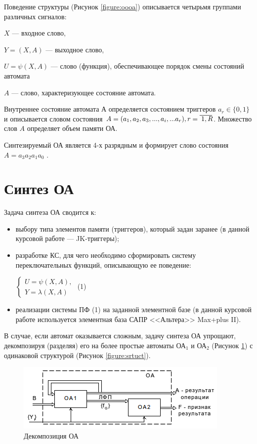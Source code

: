 Поведение структуры (Рисунок \ref{figure:oooa}) описывается четырьмя группами различных сигналов:

$X$ --- входное слово,

$Y = (X,A)$ --- выходное слово,

$U = \psi(X,A)$ --- слово (функция), обеспечивающее порядок смены состояний автомата

$A$ --- слово, характеризующее состояние автомата.

Внутреннее состояние автомата $А$ определяется состоянием триггеров $a_r \in \{0, 1\}$  и описывается словом состояния $A = (a_1, a_2, a_3, ..., a_i, ... a_r), r = \oline{1,R}$. Множество слов $A$ определяет объем памяти ОА.

Синтезируемый ОА является 4-х разрядным и формирует слово состояния $A = a_3a_2a_1a_0$ .


\newpage
\section{Синтез ОА}

Задача синтеза ОА сводится к:
\begin{itemize}
	\item выбору типа элементов памяти (триггеров), который задан заранее (в данной курсовой работе --- JK-триггеры);
	\item разработке КС, для чего необходимо сформировать систему переключательных функций, описывающую ее поведение:

	$\begin{cases}
			U = \psi(X, A), \\ Y = \lambda(X, A)
	\end{cases}$ (1)
	\item реализации системы ПФ (1) на заданной элементной базе (в данной курсовой работе используется элементная база САПР <<Альтера>> Max+plus II).

\end{itemize}

В случае, если автомат оказывается сложным, задачу синтеза ОА упрощают, декомпозируя (разделяя) его на более простые автоматы ОА$_1$ и ОА$_2$ (Рисунок \ref{figure:decomp}) с одинаковой структурой (Рисунок \ref{figure:srtuct}).

\begin{figure}[H]
	\includegraphics[scale=0.6]{images/3.png}
	\caption{Декомпозиция ОА}
	\label{figure:decomp}
\end{figure}

